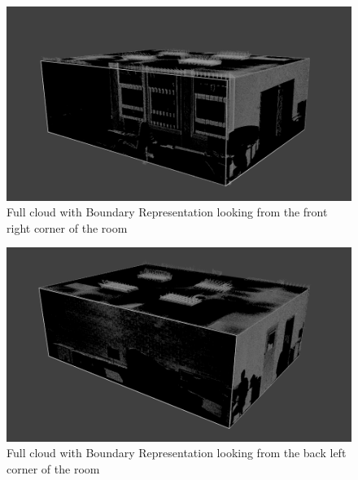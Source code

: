 			\begin{figure}[H]
			\centering
			\includegraphics[width=1\linewidth]{Includes/images/f/full5}
			\caption{Full cloud with Boundary Representation looking from the front right corner of the room}
			\label{fig:full5}
			\end{figure}
			
			\begin{figure}[H]
			\centering
			\includegraphics[width=1\linewidth]{Includes/images/f/full6}
			\caption{Full cloud with Boundary Representation looking from the back left corner of the room}
			\label{fig:full6}
			\end{figure}


			

			
			